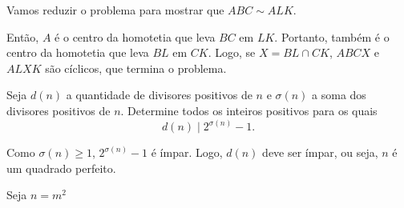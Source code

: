 \documentclass[10pt, a4paper]{article}
\begin{document}
\begin{sk}
	Vamos reduzir o problema para mostrar que $ABC \sim ALK$.

	Então,  $A$ é o centro da homotetia que leva $BC$ em $LK$. Portanto, também é o centro da homotetia que leva $BL$ em $CK$. Logo, se $X = BL \cap CK$, $ABCX$ e $ALXK$ são cíclicos, que termina o problema. 
\end{sk}

\begin{prob}
	Seja $d(n)$ a quantidade de divisores positivos de $n$ e $\sigma(n)$ a soma dos divisores positivos de $n$. Determine todos os inteiros positivos para os quais \[d(n) \mid 2^{\sigma(n)} - 1.\]
\end{prob}

\begin{sk}
	Como $\sigma(n) \ge 1$, $2^{\sigma(n)} - 1$ é ímpar. Logo,  $d(n)$ deve ser ímpar, ou seja, $n$ é um quadrado perfeito.

	Seja $n = m^2$
\end{sk}
\end{document}
